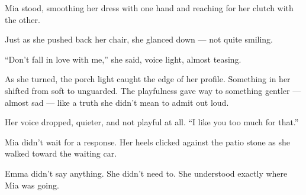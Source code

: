 Mia stood, smoothing her dress with one hand and reaching for her clutch with the other.

Just as she pushed back her chair, she glanced down — not quite smiling.

``Don’t fall in love with me,'' she said, voice light, almost teasing.

As she turned, the porch light caught the edge of her profile.
Something in her shifted from soft to unguarded. The playfulness gave way to 
something gentler --- almost sad --- like a truth she didn’t mean to admit out loud.

Her voice dropped, quieter, and not playful at all.
``I like you too much for that.''

Mia didn’t wait for a response. Her heels clicked against the patio stone as she walked 
toward the waiting car.

Emma didn’t say anything. She didn’t need to.
She understood exactly where Mia was going.



